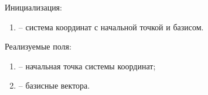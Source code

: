 	\noindent Инициализация:
	\begin{enumerate}
		\item {} -- система координат с начальной точкой и базисом.
	\end{enumerate}

	\noindent Реализуемые поля:
	\begin{enumerate}
		\item {} -- начальная точка системы координат;
		\item {} -- базисные вектора.
	\end{enumerate}